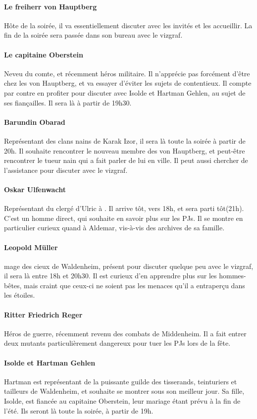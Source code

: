 \documentclass[10pt,a4paper]{book}
\begin{document}
\paragraph{Le freiherr von Hauptberg} Hôte de la soirée, il va essentiellement discuter avec les invités et les accueillir. La fin de la soirée sera passée dans son bureau avec le vizgraf.
\paragraph{Le capitaine Oberstein}Neveu du comte, et récemment héros militaire. Il n'apprécie pas forcément d'être chez les von Hauptberg, et va essayer d'éviter les sujets de contentieux. Il compte par contre en profiter pour discuter avec Isolde et Hartman Gehlen, au sujet de ses fiançailles. Il sera là à partir de 19h30.
\paragraph{Barundin Obarad} Représentant des clans nains de Karak Izor, il sera là toute la soirée à partir de 20h. Il souhaite rencontrer le nouveau membre des von Hauptberg, et peut-être rencontrer le tueur nain qui a fait parler de lui en ville. Il peut aussi chercher de l'assistance pour discuter avec le vizgraf.
\paragraph{Oskar Ulfenwacht}Représentant du clergé d'Ulric à . Il arrive tôt, vers 18h, et sera parti tôt(21h). C'est un homme direct, qui souhaite en savoir plus sur les PJs. Il se montre en particulier curieux quand à Aldemar, vis-à-vis des archives de sa famille.
\paragraph{Leopold Müller}mage des cieux de Waldenheim, présent pour discuter quelque peu avec le vizgraf, il sera là entre 18h et 20h30. Il est curieux d'en apprendre plus sur les hommes-bêtes, mais craint que ceux-ci ne soient pas les menaces qu'il a entraperçu dans les étoiles.
\paragraph{Ritter Friedrich Reger} Héros de guerre, récemment revenu des combats de Middenheim. Il a fait entrer deux mutants particulièrement dangereux pour tuer les PJs lors de la fête.
\paragraph{Isolde et Hartman Gehlen} Hartman est représentant de la puissante guilde des tisserands, teinturiers et tailleurs de Waldenheim, et souhaite se montrer sous son meilleur jour. Sa fille, Isolde, est fiancée au capitaine Oberstein, leur mariage étant prévu à la fin de l'été. Ils seront là toute la soirée, à partir de 19h.
\end{document}
